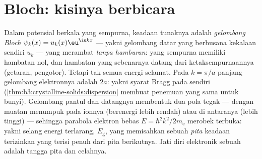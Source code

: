 \section{Bloch: kisinya berbicara}

\begin{theorem}\label{thm:b3:electrons-in-solids:bloch}
Dalam potensial berkala yang sempurna, keadaan tunaknya adalah
\emph{gelombang Bloch} $\psi_k(x) = u_k(x)\eu^{\iu kx}$ ---
yakni gelombang datar yang berbusana kekalaan  sendiri $u_k$ ---
yang merambat \emph{tanpa hamburan}:  yang sempurna memiliki
hambatan nol, dan hambatan yang sebenarnya datang dari ketaksempurnaannya
(getaran, pengotor). Tetapi tak semua energi selamat. Pada
$k = \pi/a$ panjang gelombang elektronnya adalah $2a$: yakni syarat Bragg
pada  sendiri (\cref{thm:b3:crystalline-solids:dispersion}
membuat penemuan yang sama untuk bunyi). Gelombang pantul dan datangnya
membentuk dua pola tegak --- dengan muatan menumpuk pada ionnya
(berenergi lebih rendah) atau di antaranya (lebih tinggi) --- sehingga
parabola elektron bebas $E = \hbar^2k^2/2m_{\text{e}}$ merobek terbuka:
yakni selang energi terlarang, \emph{} $E_{\text{g}}$, yang memisahkan
sebuah \emph{pita} keadaan terizinkan yang terisi penuh dari pita
berikutnya. Jati diri elektronik sebuah  adalah tangga pita dan
celahnya.
\end{theorem}
\admitted

